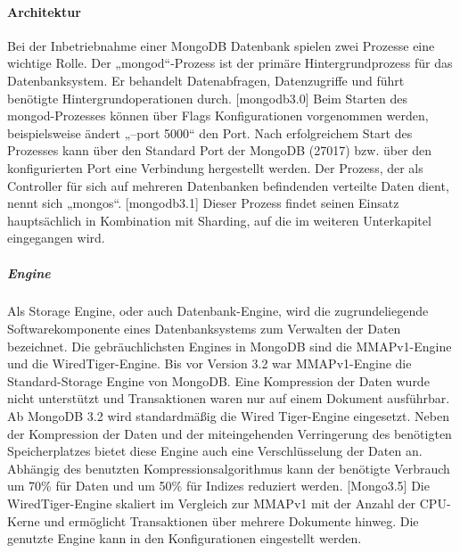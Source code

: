 \paragraph{Architektur}
Bei der Inbetriebnahme einer MongoDB Datenbank spielen zwei Prozesse eine wichtige  Rolle. \newline Der  „mongod“-Prozess ist der primäre Hintergrundprozess für das Datenbanksystem. Er behandelt Datenabfragen, Datenzugriffe und führt benötigte Hintergrundoperationen durch. [mongodb3.0] Beim Starten des mongod-Prozesses können über Flags Konfigurationen vorgenommen werden, beispielsweise ändert „--port 5000“ den Port. Nach erfolgreichem Start des Prozesses kann über den Standard Port der MongoDB (27017) bzw. über den konfigurierten Port eine Verbindung hergestellt werden.\newline
Der Prozess, der als Controller für sich auf mehreren Datenbanken befindenden verteilte Daten dient, nennt sich „mongos“. [mongodb3.1] Dieser Prozess findet seinen Einsatz hauptsächlich in Kombination mit Sharding, auf die im weiteren Unterkapitel eingegangen wird. \newline

\subparagraph{Engine}
Als Storage Engine, oder auch Datenbank-Engine, wird die zugrundeliegende Softwarekomponente eines Datenbanksystems zum Verwalten der Daten bezeichnet. Die gebräuchlichsten Engines in MongoDB sind die MMAPv1-Engine und die WiredTiger-Engine.\newline
Bis vor Version 3.2 war MMAPv1-Engine die Standard-Storage Engine von MongoDB. Eine Kompression der Daten wurde nicht unterstützt und Transaktionen waren nur auf einem Dokument ausführbar. Ab MongoDB 3.2 wird standardmäßig die Wired Tiger-Engine eingesetzt. Neben der Kompression der Daten und der miteingehenden Verringerung des benötigten Speicherplatzes bietet diese Engine auch eine Verschlüsselung der Daten an. Abhängig des benutzten Kompressionsalgorithmus kann der benötigte Verbrauch um 70\% für Daten und um 50\% für Indizes reduziert werden. [Mongo3.5] Die WiredTiger-Engine skaliert im Vergleich zur MMAPv1 mit der Anzahl der CPU-Kerne und ermöglicht Transaktionen über mehrere Dokumente hinweg. Die genutzte Engine kann in den Konfigurationen eingestellt werden.
\newline

